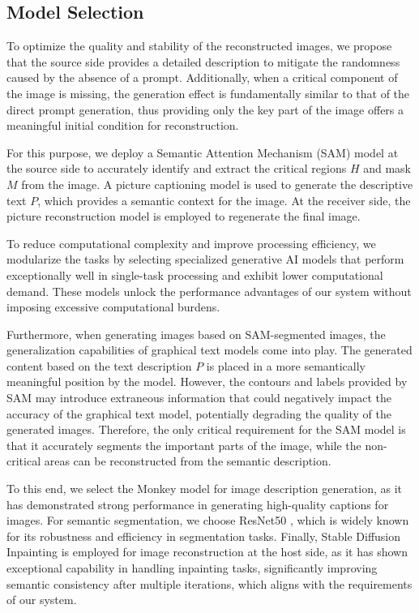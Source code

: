 \documentclass[conference]{IEEEtran}
\begin{document}
\subsection{Model Selection}
To optimize the quality and stability of the reconstructed images, we propose that the source side provides a detailed description to mitigate the randomness caused by the absence of a prompt. Additionally, when a critical component of the image is missing, the generation effect is fundamentally similar to that of the direct prompt generation, thus providing only the key part of the image offers a meaningful initial condition for reconstruction.

For this purpose, we deploy a Semantic Attention Mechanism (SAM) model at the source side to accurately identify and extract the critical regions \( H \) and mask \( M \) from the image. A picture captioning model is used to generate the descriptive text \( P \), which provides a semantic context for the image. At the receiver side, the picture reconstruction model is employed to regenerate the final image.

To reduce computational complexity and improve processing efficiency, we modularize the tasks by selecting specialized generative AI models that perform exceptionally well in single-task processing and exhibit lower computational demand. These models unlock the performance advantages of our system without imposing excessive computational burdens.

Furthermore, when generating images based on SAM-segmented images, the generalization capabilities of graphical text models come into play. The generated content based on the text description \( P \) is placed in a more semantically meaningful position by the model. However, the contours and labels provided by SAM may introduce extraneous information that could negatively impact the accuracy of the graphical text model, potentially degrading the quality of the generated images. Therefore, the only critical requirement for the SAM model is that it accurately segments the important parts of the image, while the non-critical areas can be reconstructed from the semantic description.

To this end, we select the Monkey model \cite{li2023monkey} for image description generation, as it has demonstrated strong performance in generating high-quality captions for images. For semantic segmentation, we choose ResNet50 \cite{he2016deep}, which is widely known for its robustness and efficiency in segmentation tasks. Finally, Stable Diffusion Inpainting \cite{Rombach_2022_CVPR} is employed for image reconstruction at the host side, as it has shown exceptional capability in handling inpainting tasks, significantly improving semantic consistency after multiple iterations, which aligns with the requirements of our system.
\end{document}
